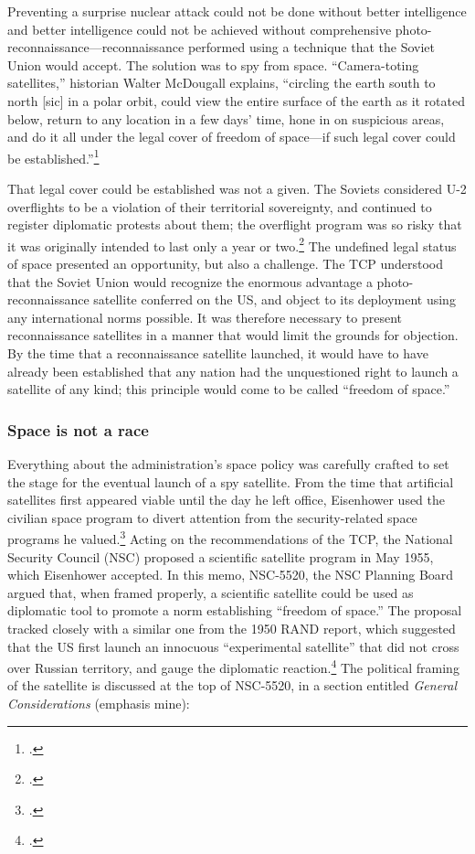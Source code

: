 \documentclass[14pt]{extarticle}
\begin{document}
Preventing a surprise nuclear attack could not be done without better intelligence and better intelligence could not be achieved without comprehensive photo-reconnaissance---reconnaissance performed using a technique that the Soviet Union would accept. The solution was to spy from space. \enquote{Camera-toting satellites,} historian Walter McDougall explains, \enquote{circling the earth south to north [sic] in a polar orbit, could view the entire surface of the earth as it rotated below, return to any location in a few days' time, hone in on suspicious areas, and do it all under the legal cover of freedom of space---if such legal cover could be established.}\footcite[p.~117]{mcdougall_heavens_1985}

That legal cover could be established was not a given. The Soviets considered U-2 overflights to be a violation of their territorial sovereignty, and continued to register diplomatic protests about them; the overflight program was so risky that it was originally intended to last only a year or two.\footcite[p.~33]{lindgren_trust_2000} The undefined legal status of space presented an opportunity, but also a challenge. The TCP understood that the Soviet Union would recognize the enormous advantage a photo-reconnaissance satellite conferred on the US, and object to its deployment using any international norms possible. It was therefore necessary to present reconnaissance satellites in a manner that would limit the grounds for objection. By the time that a reconnaissance satellite launched, it would have to have already been established that any nation had the unquestioned right to launch a satellite of any kind; this principle would come to be called \enquote{freedom of space.}

\subsubsection{Space is not a race}
Everything about the administration's space policy was carefully crafted to set the stage for the eventual launch of a spy satellite. From the time that artificial satellites first appeared viable until the day he left office, Eisenhower used the civilian space program to divert attention from the security-related space programs he valued.\footcite[p.~119]{day_eye_2015} Acting on the recommendations of the TCP, the National Security Council (NSC) proposed a scientific satellite program in May 1955, which Eisenhower accepted. In this memo, NSC-5520, the NSC Planning Board argued that, when framed properly, a scientific satellite could be used as diplomatic tool to promote a norm establishing ``freedom of space.'' The proposal tracked closely with a similar one from the 1950 RAND report, which suggested that the US first launch an innocuous ``experimental satellite'' that did not cross over Russian territory, and gauge the diplomatic reaction.\footcite[p.~21]{kecskemetic_satellite_1950} The political framing of the satellite is discussed at the top of NSC-5520, in a section entitled \emph{General Considerations} (emphasis mine):
\newline
\end{document}
